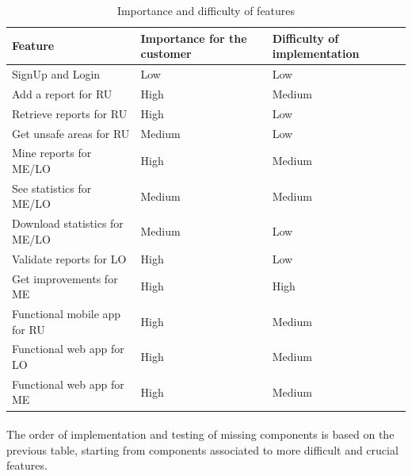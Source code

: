 			\begin{table}[!h]
				\centering
				\begin{tabular}{L{0.4\textwidth}P{0.2\textwidth}P{0.2\textwidth}}
					\toprule
					Feature & Importance for the customer & Difficulty of implementation \\
					\midrule
					 SignUp and Login & Low & Low \\
					 Add a report for RU & High & Medium \\
					 Retrieve reports for RU & High & Low \\
					 Get unsafe areas for RU & Medium & Low \\
					 Mine reports for ME/LO & High & Medium \\ 
					 See statistics for ME/LO & Medium & Medium \\
					 Download statistics for ME/LO & Medium & Low \\
					 Validate reports for LO & High & Low \\
					 Get improvements for ME & High & High \\
					 Functional mobile app for RU & High & Medium \\
					 Functional web app for LO & High & Medium \\
					 Functional web app for ME & High & Medium \\
					 \bottomrule
				\end{tabular}
				\caption{Importance and difficulty of features}
			\end{table}
		\paragraph{}
			The order of implementation and testing of missing components is based on the previous table, starting from components associated to more difficult and crucial features. 
			
